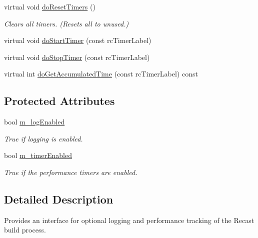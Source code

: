 \begin{DoxyCompactItemize}
\mbox{\label{classrcContext_a57a97f408dac1438d6eae0993fa68570}} 
virtual void \hyperlink{classrcContext_a57a97f408dac1438d6eae0993fa68570}{do\+Reset\+Timers} ()
\begin{DoxyCompactList}\small\item\em Clears all timers. (Resets all to unused.) \end{DoxyCompactList}\item 
virtual void \hyperlink{classrcContext_a9bf9c573becd7256d2b5cfafdd789cb5}{do\+Start\+Timer} (const rc\+Timer\+Label)
\item 
virtual void \hyperlink{classrcContext_a84e11ac2367269561b33bd76ab0d0fa4}{do\+Stop\+Timer} (const rc\+Timer\+Label)
\item 
virtual int \hyperlink{classrcContext_aac5af865c567bd0e362cb6a98c65c860}{do\+Get\+Accumulated\+Time} (const rc\+Timer\+Label) const
\end{DoxyCompactItemize}
\subsection*{Protected Attributes}
\begin{DoxyCompactItemize}
\item 
\mbox{\label{classrcContext_af3690c070989bc399cd39e2da2b0fbad}} 
bool \hyperlink{classrcContext_af3690c070989bc399cd39e2da2b0fbad}{m\+\_\+log\+Enabled}
\begin{DoxyCompactList}\small\item\em True if logging is enabled. \end{DoxyCompactList}\item 
\mbox{\label{classrcContext_a851ba8cc41ee2185be82fe11e847c846}} 
bool \hyperlink{classrcContext_a851ba8cc41ee2185be82fe11e847c846}{m\+\_\+timer\+Enabled}
\begin{DoxyCompactList}\small\item\em True if the performance timers are enabled. \end{DoxyCompactList}\end{DoxyCompactItemize}


\subsection{Detailed Description}
Provides an interface for optional logging and performance tracking of the Recast build process.


